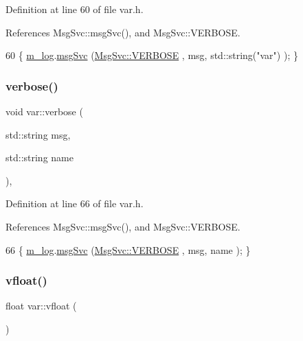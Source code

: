 Definition at line 60 of file var.\+h.



References Msg\+Svc\+::msg\+Svc(), and Msg\+Svc\+::\+V\+E\+R\+B\+O\+SE.


\begin{DoxyCode}
60 \{ \hyperlink{classvar_a5dfdc5180270038b686ad3013874a026}{m\_log}.\hyperlink{classMsgSvc_ad25f18047920cc59a314e5098259711c}{msgSvc} (\hyperlink{classMsgSvc_ae671eb7301996cd049d2da8a65925926af655256b06494ade5ba830abe5401ec9}{MsgSvc::VERBOSE} , msg, std::string(\textcolor{stringliteral}{"var"}) ); \}
\end{DoxyCode}
\mbox{\label{classvar_a381db77de9128014c9ddb5cfc7793f65}} 
\subsubsection{\texorpdfstring{verbose()}{verbose()}\hspace{0.1cm}{\footnotesize\ttfamily [2/2]}}
{\footnotesize\ttfamily void var\+::verbose (\begin{DoxyParamCaption}\item[{std\+::string}]{msg,  }\item[{std\+::string}]{name }\end{DoxyParamCaption})\hspace{0.3cm}{\ttfamily [inline]}, {\ttfamily [private]}}



Definition at line 66 of file var.\+h.



References Msg\+Svc\+::msg\+Svc(), and Msg\+Svc\+::\+V\+E\+R\+B\+O\+SE.


\begin{DoxyCode}
66 \{ \hyperlink{classvar_a5dfdc5180270038b686ad3013874a026}{m\_log}.\hyperlink{classMsgSvc_ad25f18047920cc59a314e5098259711c}{msgSvc} (\hyperlink{classMsgSvc_ae671eb7301996cd049d2da8a65925926af655256b06494ade5ba830abe5401ec9}{MsgSvc::VERBOSE} , msg, name ); \}
\end{DoxyCode}
\mbox{\label{classvar_ac811c23f3fcb941746c1dd419e68b501}} 
\subsubsection{\texorpdfstring{vfloat()}{vfloat()}}
{\footnotesize\ttfamily float var\+::vfloat (\begin{DoxyParamCaption}{ }\end{DoxyParamCaption})\hspace{0.3cm}{\ttfamily [inline]}}



